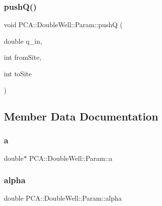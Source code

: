 \hypertarget{class_p_c_a_1_1_double_well_1_1_param_a7ba9731477b3baadab67a4f8a48d2ed3}{}\label{class_p_c_a_1_1_double_well_1_1_param_a7ba9731477b3baadab67a4f8a48d2ed3} 
\subsubsection{\texorpdfstring{push\+Q()}{pushQ()}}
{\footnotesize\ttfamily void P\+C\+A\+::\+Double\+Well\+::\+Param\+::pushQ (\begin{DoxyParamCaption}\item[{double}]{q\+\_\+in,  }\item[{int}]{from\+Site,  }\item[{int}]{to\+Site }\end{DoxyParamCaption})}



\subsection{Member Data Documentation}
\hypertarget{class_p_c_a_1_1_double_well_1_1_param_a793aa698d3bcc8923a1e802727ce1b41}{}\label{class_p_c_a_1_1_double_well_1_1_param_a793aa698d3bcc8923a1e802727ce1b41} 
\subsubsection{\texorpdfstring{a}{a}}
{\footnotesize\ttfamily double$\ast$ P\+C\+A\+::\+Double\+Well\+::\+Param\+::a}

\hypertarget{class_p_c_a_1_1_double_well_1_1_param_aaaa04b33180f32a53b04cd9687ca8232}{}\label{class_p_c_a_1_1_double_well_1_1_param_aaaa04b33180f32a53b04cd9687ca8232} 
\subsubsection{\texorpdfstring{alpha}{alpha}}
{\footnotesize\ttfamily double P\+C\+A\+::\+Double\+Well\+::\+Param\+::alpha}

